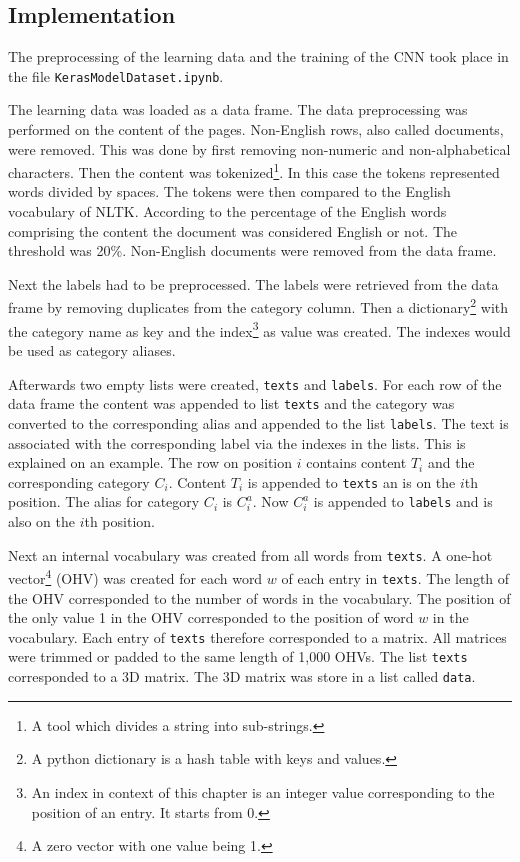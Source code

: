 \subsection{Implementation} \label{ClassificationImplementation}
The preprocessing of the learning data and the training of the CNN took place in the file \texttt{KerasModelDataset.ipynb}. 

The learning data was loaded as a data frame. The data preprocessing was performed on the content of the pages. Non-English rows, also called documents, were removed. This was done by first removing non-numeric and non-alphabetical characters. Then the content was tokenized\footnote{A tool which divides a string into sub-strings.}. In this case the tokens represented words divided by spaces. The tokens were then compared to the English vocabulary of NLTK. According to the percentage of the English words comprising the content the document was considered English or not. The threshold was 20\%. Non-English documents were removed from the data frame.

Next the labels had to be preprocessed. The labels were retrieved from the data frame by removing duplicates from the category column. Then a dictionary\footnote{A python dictionary is a hash table with keys and values.} with the category name as key and the index\footnote{An index in context of this chapter is an integer value corresponding to the position of an entry. It starts from 0.} as value was created. The indexes would be used as category aliases. 

Afterwards two empty lists were created, \texttt{texts} and \texttt{labels}. For each row of the data frame the content was appended to list \texttt{texts} and the category was converted to the corresponding alias and appended to the list \texttt{labels}. The text is associated with the corresponding label via the indexes in the lists.  This is explained on an example. The row on position $i$ contains content $T_i$ and the corresponding category $C_i$. Content $T_i$ is appended to \texttt{texts} an is on the $i$th position. The alias for category $C_i$ is $C^a_i$. Now $C^a_i$ is appended to \texttt{labels} and is also on the $i$th position.

Next an internal vocabulary was created from all words from \texttt{texts}. A one-hot vector\footnote{A zero vector with one value being 1.} (OHV) was created for each word $w$ of each entry in \texttt{texts}. The length of the OHV corresponded to the number of words in the vocabulary. The position of the only value 1 in the OHV corresponded to the position of word $w$ in the vocabulary. Each entry of \texttt{texts} therefore corresponded to a matrix. All matrices were trimmed or padded to the same length of 1,000 OHVs. The list \texttt{texts} corresponded to a 3D matrix. The 3D matrix was store in a list called \texttt{data}.


